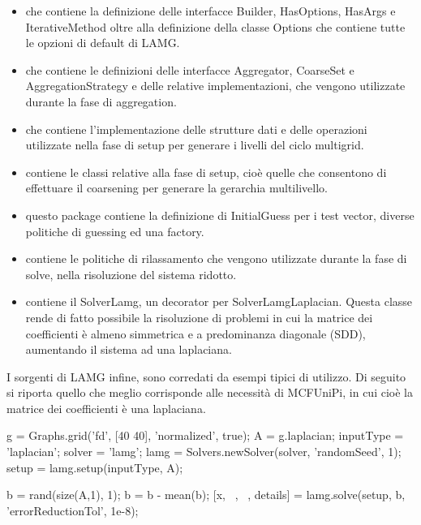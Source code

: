 \begin{itemize}
\item {} che contiene la definizione delle interfacce Builder, HasOptions, HasArgs e IterativeMethod oltre alla definizione della classe Options che contiene tutte le opzioni di default di LAMG.
\item {} che contiene le definizioni delle interfacce Aggregator, CoarseSet e AggregationStrategy e delle relative implementazioni, che vengono utilizzate durante la fase di aggregation.
\item {} che contiene l'implementazione delle strutture dati e delle operazioni utilizzate nella fase di setup per generare i livelli del ciclo multigrid.
\item {} contiene le classi relative alla fase di setup, cioè quelle che consentono di effettuare il coarsening per generare la gerarchia multilivello.
\item {} questo package contiene la definizione di InitialGuess per i test vector, diverse politiche di guessing ed una factory.
\item {} contiene le politiche di rilassamento che vengono utilizzate durante la fase di solve, nella risoluzione del sistema ridotto.
\item {} contiene il SolverLamg, un decorator per SolverLamgLaplacian. Questa classe rende di fatto possibile la risoluzione di problemi in cui la matrice dei coefficienti è almeno simmetrica e a predominanza diagonale (SDD), aumentando il sistema ad una laplaciana.
\end{itemize}

I sorgenti di LAMG infine, sono corredati da esempi tipici di utilizzo. Di seguito si riporta quello che meglio corrisponde alle necessità di MCFUniPi, in cui cioè la matrice dei coefficienti è una laplaciana.

\begin{codice}[commandchars=\\\{\}]
g = Graphs.grid('fd', [40 40], 'normalized', true);
A = g.laplacian;
inputType = 'laplacian';
solver = 'lamg';
lamg    = Solvers.newSolver(solver, 'randomSeed', 1);\label{code:factory}
setup   = lamg.setup(inputType, A);\label{code:setup}

b = rand(size(A,1), 1);
b = b - mean(b);
[x, ~, ~, details] = lamg.solve(setup, b, 'errorReductionTol', 1e-8);
\end{codice}

